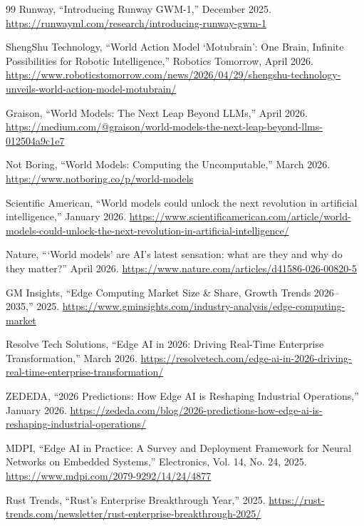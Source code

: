 \documentclass[11pt,a4paper]{ltjsarticle}
\begin{document}
\begin{thebibliography}{99}
Runway,
``Introducing Runway GWM-1,''
December 2025.
\url{https://runwayml.com/research/introducing-runway-gwm-1}

ShengShu Technology,
``World Action Model `Motubrain': One Brain, Infinite Possibilities for Robotic Intelligence,''
Robotics Tomorrow, April 2026.
\url{https://www.roboticstomorrow.com/news/2026/04/29/shengshu-technology-unveils-world-action-model-motubrain/}

Graison,
``World Models: The Next Leap Beyond LLMs,''
April 2026.
\url{https://medium.com/@graison/world-models-the-next-leap-beyond-llms-012504a9c1e7}

Not Boring,
``World Models: Computing the Uncomputable,''
March 2026.
\url{https://www.notboring.co/p/world-models}

Scientific American,
``World models could unlock the next revolution in artificial intelligence,''
January 2026.
\url{https://www.scientificamerican.com/article/world-models-could-unlock-the-next-revolution-in-artificial-intelligence/}

Nature,
```World models' are AI's latest sensation: what are they and why do they matter?''
April 2026.
\url{https://www.nature.com/articles/d41586-026-00820-5}

GM Insights,
``Edge Computing Market Size \& Share, Growth Trends 2026--2035,''
2025.
\url{https://www.gminsights.com/industry-analysis/edge-computing-market}

Resolve Tech Solutions,
``Edge AI in 2026: Driving Real-Time Enterprise Transformation,''
March 2026.
\url{https://resolvetech.com/edge-ai-in-2026-driving-real-time-enterprise-transformation/}

ZEDEDA,
``2026 Predictions: How Edge AI is Reshaping Industrial Operations,''
January 2026.
\url{https://zededa.com/blog/2026-predictions-how-edge-ai-is-reshaping-industrial-operations/}

MDPI,
``Edge AI in Practice: A Survey and Deployment Framework for Neural Networks on Embedded Systems,''
Electronics, Vol. 14, No. 24, 2025.
\url{https://www.mdpi.com/2079-9292/14/24/4877}

Rust Trends,
``Rust's Enterprise Breakthrough Year,''
2025.
\url{https://rust-trends.com/newsletter/rust-enterprise-breakthrough-2025/}


\end{thebibliography}
\end{document}
